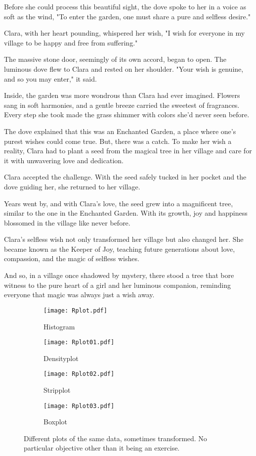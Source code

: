\documentclass[10pt, a4paper, titlepage]{article}
\begin{document}
Before she could process this beautiful sight, the dove spoke to her in a voice as soft as the wind, "To enter the garden, one must share a pure and selfless desire."

Clara, with her heart pounding, whispered her wish, "I wish for everyone in my village to be happy and free from suffering."

The massive stone door, seemingly of its own accord, began to open. The luminous dove flew to Clara and rested on her shoulder. "Your wish is genuine, and so you may enter," it said.

Inside, the garden was more wondrous than Clara had ever imagined. Flowers sang in soft harmonies, and a gentle breeze carried the sweetest of fragrances. Every step she took made the grass shimmer with colors she'd never seen before.

The dove explained that this was an Enchanted Garden, a place where one’s purest wishes could come true. But, there was a catch. To make her wish a reality, Clara had to plant a seed from the magical tree in her village and care for it with unwavering love and dedication.

Clara accepted the challenge. With the seed safely tucked in her pocket and the dove guiding her, she returned to her village.

Years went by, and with Clara's love, the seed grew into a magnificent tree, similar to the one in the Enchanted Garden. With its growth, joy and happiness blossomed in the village like never before.

Clara's selfless wish not only transformed her village but also changed her. She became known as the Keeper of Joy, teaching future generations about love, compassion, and the magic of selfless wishes.

And so, in a village once shadowed by mystery, there stood a tree that bore witness to the pure heart of a girl and her luminous companion, reminding everyone that magic was always just a wish away.

\newpage
\begin{figure}
	\centering
	\begin{subfigure}{.49\textwidth}
		\texttt{[image: Rplot.pdf]}
		\caption{Histogram}
	\end{subfigure}
	\begin{subfigure}{.49\textwidth}
		\texttt{[image: Rplot01.pdf]}
		\caption{Densityplot}
	\end{subfigure}
	\begin{subfigure}{.49\textwidth}
		\texttt{[image: Rplot02.pdf]}
		\caption{Stripplot}
	\end{subfigure}
	\begin{subfigure}{.49\textwidth}
		\texttt{[image: Rplot03.pdf]}
		\caption{Boxplot}
	\end{subfigure}
	\caption{Different plots of the same data, sometimes transformed. No particular objective other than it being an exercise.}
\end{figure}
\end{document}
